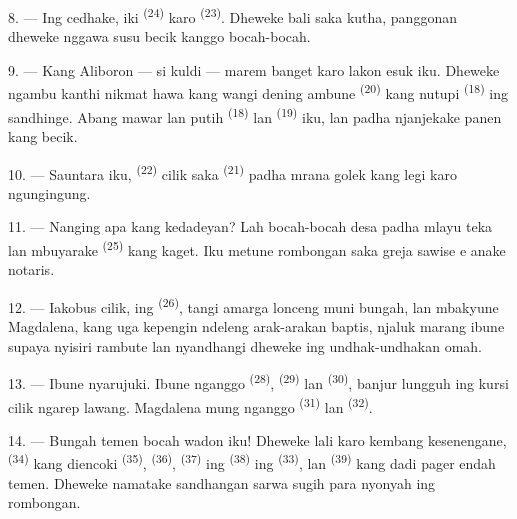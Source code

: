 8. --- Ing cedhake, iki  \textsuperscript{(24)} karo
 \textsuperscript{(23)}. Dheweke bali saka kutha,
panggonan dheweke nggawa susu becik kanggo bocah-bocah.

\VUsaut{4.0mm}
\VUsaut{3.4mm}

9. --- Kang Aliboron — si kuldi — marem banget karo lakon esuk iku.
Dheweke ngambu kanthi nikmat hawa kang wangi dening ambune
 \textsuperscript{(20)} kang nutupi  \textsuperscript{(18)} ing 
sandhinge. Abang mawar lan putih 
\textsuperscript{(18)} lan  \textsuperscript{(19)}
iku, lan padha njanjekake panen kang becik.

10. --- Sauntara iku,  \textsuperscript{(22)} cilik saka
 \textsuperscript{(21)} padha mrana golek
 kang legi karo ngungingung.

11. --- Nanging apa kang kedadeyan? Lah bocah-bocah desa padha
mlayu teka lan mbuyarake  \textsuperscript{(25)} kang
kaget. Iku metune rombongan saka greja sawise e anake
notaris.

12. --- Iakobus cilik, ing 
\textsuperscript{(26)}, tangi amarga lonceng muni bungah, lan
mbakyune Magdalena, kang uga kepengin ndeleng arak-arakan baptis,
njaluk marang ibune supaya nyisiri rambute lan nyandhangi dheweke ing
undhak-undhakan omah.

13. --- Ibune nyarujuki. Ibune nganggo 
\textsuperscript{(28)},  \textsuperscript{(29)} lan
 \textsuperscript{(30)}, banjur lungguh ing kursi cilik
ngarep lawang. Magdalena mung nganggo 
\textsuperscript{(31)} lan  \textsuperscript{(32)}.

14. --- Bungah temen bocah wadon iku! Dheweke lali karo kembang
kesenengane,  \textsuperscript{(34)} kang
diencoki  \textsuperscript{(35)},  \textsuperscript{(36)}, 
\textsuperscript{(37)} ing  \textsuperscript{(38)} ing
 \textsuperscript{(33)}, lan 
\textsuperscript{(39)} kang dadi pager endah temen. Dheweke namatake
sandhangan sarwa sugih para nyonyah ing rombongan.

